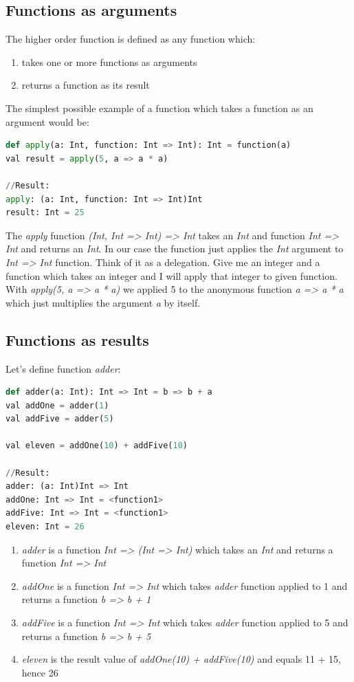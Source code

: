 \documentclass[12pt,twoside,a4paper]{report}
\begin{document}
\subsection{Functions as arguments}\label{6.5.2}

The higher order function is defined as any function which:
\begin{enumerate}\itemsep1pt \parskip0pt 
\item takes one or more functions as arguments
\item returns a function as its result
\end{enumerate}

The simplest possible example of a function which takes a function as an argument would be:
\begin{lstlisting}[language=python]
def apply(a: Int, function: Int => Int): Int = function(a)
val result = apply(5, a => a * a)

//Result:
apply: (a: Int, function: Int => Int)Int
result: Int = 25
\end{lstlisting}
The \emph{apply} function \emph{(Int, Int => Int) => Int} takes an \emph{Int} and function \emph{Int => Int} and returns an \emph{Int}. In our case the function just applies the \emph{Int} argument to \emph{Int => Int} function. Think of it as a delegation. Give me an integer and a function which takes an integer and I will apply that integer to given function.
With \emph{apply(5, a => a * a)} we applied 5 to the anonymous function \emph{a => a * a} which just multiplies the argument \emph{a} by itself.

\subsection{Functions as results}\label{6.5.3}

Let's define function \emph{adder}:
\begin{lstlisting}[language=python]
def adder(a: Int): Int => Int = b => b + a
val addOne = adder(1)
val addFive = adder(5)

val eleven = addOne(10) + addFive(10)

//Result:
adder: (a: Int)Int => Int
addOne: Int => Int = <function1>
addFive: Int => Int = <function1>
eleven: Int = 26
\end{lstlisting}

\begin{enumerate}\itemsep1pt \parskip0pt 
\item \emph{adder} is a function \emph{Int => (Int => Int)} which takes an \emph{Int} and returns a function \emph{Int => Int}
\item \emph{addOne} is a function \emph{Int => Int} which takes \emph{adder} function applied to 1 and returns a function \emph{b => b + 1}
\item \emph{addFive} is a function \emph{Int => Int} which takes \emph{adder} function applied to 5 and returns a function \emph{b => b + 5}
\item \emph{eleven} is the result value of \emph{addOne(10) + addFive(10)} and equals 11 + 15, hence 26
\end{enumerate}
\end{document}
